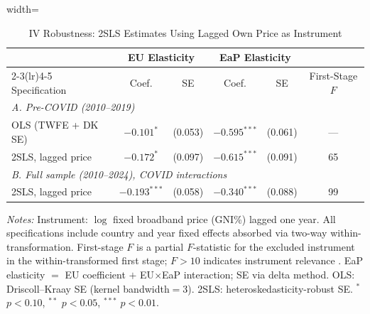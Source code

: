 \begin{table}[htbp]
\centering
\caption{IV Robustness: 2SLS Estimates Using Lagged Own Price as Instrument}
\label{tab:iv_robustness}
\begin{minipage}{\textwidth}
\begin{adjustbox}{width=\textwidth}
\scriptsize
\begin{tabular}{lccccc}
\toprule
& \multicolumn{2}{c}{EU Elasticity} & \multicolumn{2}{c}{EaP Elasticity} & \\
\cmidrule(lr){2-3}\cmidrule(lr){4-5}
Specification & Coef. & SE & Coef. & SE & First-Stage $F$ \\
\midrule
\multicolumn{6}{l}{\textit{A. Pre-COVID (2010--2019)}} \\[2pt]
\phantom{x}OLS (TWFE + DK SE) & $-0.101^{*}$ & (0.053) & $-0.595^{***}$ & (0.061) & --- \\[2pt]
\phantom{x}2SLS, lagged price & $-0.172^{*}$ & (0.097) & $-0.615^{***}$ & (0.091) & 65 \\[2pt]
\midrule
\multicolumn{6}{l}{\textit{B. Full sample (2010--2024), COVID interactions}} \\[2pt]
\phantom{x}2SLS, lagged price & $-0.193^{***}$ & (0.058) & $-0.340^{***}$ & (0.088) & 99 \\[2pt]
\bottomrule
\end{tabular}
\end{adjustbox}
\par\vspace{4pt}
\scriptsize
\textit{Notes:} Instrument: $\log$ fixed broadband price (GNI\%) lagged one year.
All specifications include country and year fixed effects absorbed via two-way
within-transformation. First-stage $F$ is a partial $F$-statistic for the excluded
instrument in the within-transformed first stage; $F > 10$ indicates instrument
relevance \citep{stock2002testing}.
EaP elasticity $=$ EU coefficient $+$ EU$\times$EaP interaction; SE via delta method.
OLS: Driscoll--Kraay SE (kernel bandwidth$=$3). 2SLS: heteroskedasticity-robust SE.
$^{*}$ $p < 0.10$, $^{**}$ $p < 0.05$, $^{***}$ $p < 0.01$.
\end{minipage}
\end{table}

